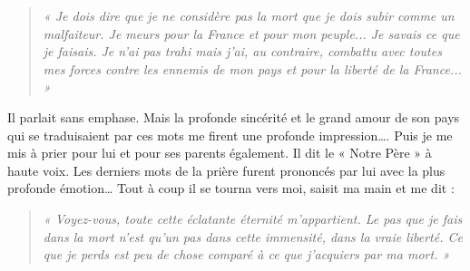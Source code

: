 \begin{quote}\itshape
« Je dois dire que je ne considère pas la mort que je dois subir comme un malfaiteur. Je meurs pour la
France et pour mon peuple... Je savais ce que je faisais. Je n’ai pas trahi mais j’ai, au contraire, combattu
avec toutes mes forces contre les ennemis de mon pays et pour la liberté de la France... »
\end{quote}

Il parlait sans emphase. Mais la profonde sincérité et le grand amour de son pays qui se
traduisaient par ces mots me firent une profonde impression…. Puis je me mis à prier pour lui et
pour ses parents également. Il dit le « Notre Père » à haute voix. Les derniers mots de la prière
furent prononcés par lui avec la plus profonde émotion… Tout à coup il se tourna vers moi, saisit
ma main et me dit :

\begin{quote}\itshape
« Voyez-vous, toute cette éclatante éternité m’appartient. Le pas que je fais dans la mort n’est qu’un pas
dans cette immensité, dans la vraie liberté. Ce que je perds est peu de chose comparé à ce que j’acquiers
par ma mort. »
\end{quote}
